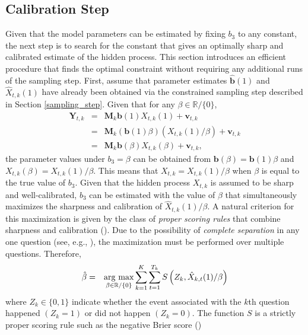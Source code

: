 \documentclass[aoas, preprint]{imsart}
\newcommand{\argmax}{\operatornamewithlimits{arg\ max}}
\numberwithin{equation}{section}
\theoremstyle{plain}
\newcommand{\R}{\mathbb{R}}
\begin{document}
\subsection{Calibration Step}
\label{calibration_step}
Given that the model parameters can be estimated by fixing $b_3$ to any constant, the next step is to search for the constant that gives an optimally sharp and calibrated estimate of the hidden process.  This section introduces an efficient procedure that finds the optimal constraint without requiring any additional runs of the sampling step. First, assume that parameter estimates  $\hat{\boldsymbol{b}}(1)$ and $\hat{X}_{t, k}(1)$ have already been obtained via the constrained sampling step described in Section \ref{sampling_step}. Given that for any $\beta \in \R / \{0\}$,
\begin{eqnarray*}
\boldsymbol{Y}_{t, k} &=&  \boldsymbol{M}_k \boldsymbol{b} (1) X_{t, k}(1)+ \boldsymbol{v}_{t, k}\\
 &=&   \boldsymbol{M}_k \left(\boldsymbol{b} (1) \beta \right) \left(X_{t, k}(1)/\beta\right)  + \boldsymbol{v}_{t, k}\\
&=&   \boldsymbol{M}_k \boldsymbol{b} (\beta) X_{t, k}(\beta) + \boldsymbol{v}_{t, k},
\end{eqnarray*}
the parameter values under $b_{3} = \beta$ can be obtained from $\boldsymbol{b} (\beta) = \boldsymbol{b} (1) \beta $ and $X_{t, k}(\beta) = X_{t, k}(1)/\beta$. 
This means that $X_{t,k} = X_{t,k}(1)/\beta$ when $\beta$ is equal to the true value of $b_3$. Given that the hidden process $X_{t, k}$ is assumed to be sharp and well-calibrated, $b_3$ can be estimated with the value of $\beta$ that simultaneously maximizes the sharpness and calibration of $\hat{X}_{t, k}(1) / \beta$. A natural criterion for this maximization is given by the class of \textit{proper scoring rules} that combine sharpness and calibration (\citet{gneiting2008rejoinder, buja2005loss}). Due to the possibility of \textit{complete separation} in any one question (see, e.g., \citet{gelman2008weakly}), the maximization must be performed over multiple questions. Therefore,
\begin{eqnarray}
 \hat{\beta}&=&  \argmax_{\beta \in \R / \{0\}} \sum_{k=1}^K \sum_{t=1}^{T_k}  S\left(Z_k, \hat{X}_{k,t}(1) / \beta \right) \label{OSE}
\end{eqnarray}
where $Z_k \in \{0, 1\}$ indicate whether the event associated with the $k$th question happened $\left(Z_k = 1\right)$ or did not happen $\left(Z_k = 0\right)$. The function $S$ is a strictly proper scoring rule such as the negative Brier score (\citet{Brier})
\end{document}
